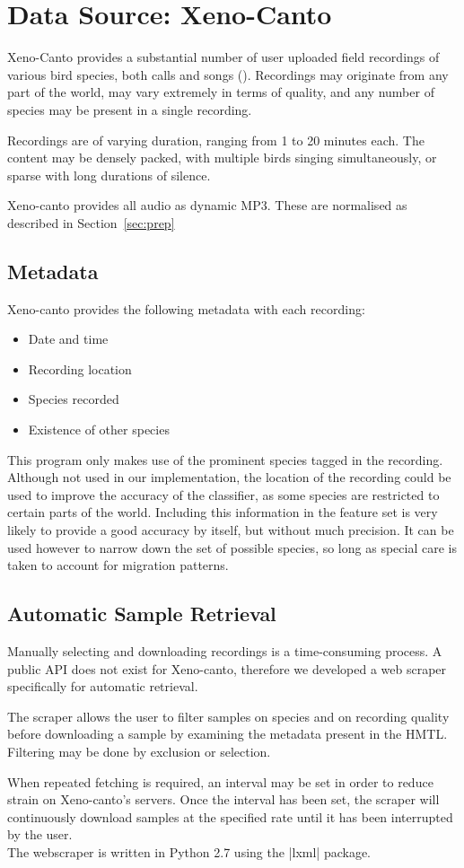 \section{Data Source: Xeno-Canto}

Xeno-Canto provides a substantial number of user uploaded field recordings
of various bird species, both calls and songs (\textcite{xenocanto}).
Recordings may originate from any part of the world, may vary extremely in
terms of quality, and any number of species may be present in a single
recording.

Recordings are of varying duration, ranging from 1 to 20 minutes each.
The content may be densely packed, with multiple birds singing simultaneously,
or sparse with long durations of silence.

Xeno-canto provides all audio as dynamic MP3.
These are normalised as described in Section~\ref{sec:prep}

\subsection{Metadata}
Xeno-canto provides the following metadata with each recording:
\begin{itemize}[noitemsep]
  \item Date and time
  \item Recording location
  \item Species recorded
  \item Existence of other species
\end{itemize}

This program only makes use of the prominent species tagged in the recording.
Although not used in our implementation, the location of the recording could be
used to improve the accuracy of the classifier, as some species are restricted
to certain parts of the world.
Including this information in the feature set is very likely to provide a
good accuracy by itself, but without much precision.
It can be used however to narrow down the set of possible species, so long as
special care is taken to account for migration patterns.


\subsection{Automatic Sample Retrieval}
Manually selecting and downloading recordings is a time-consuming process.
A public API does not exist for Xeno-canto, therefore we developed a web scraper
specifically for automatic retrieval.

The scraper allows the user to filter samples on species and on recording quality
before downloading a sample by examining the metadata present in the HMTL.
Filtering may be done by exclusion or selection.

When repeated fetching is required, an interval may be set in order to reduce
strain on Xeno-canto's servers.
Once the interval has been set, the scraper will continuously download samples
at the specified rate until it has been interrupted by the user.\\

The webscraper is written in Python 2.7 using the |lxml| package.
